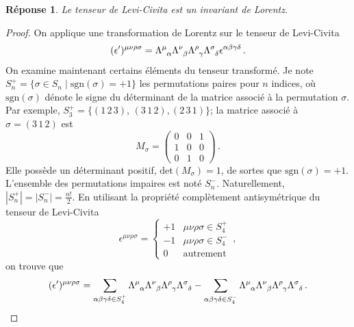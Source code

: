 \documentclass{article}
\numberwithin{equation}{section}
\theoremstyle{solution}
\newtheorem{solution}{Réponse}[section]
\begin{document}
\begin{solution}
Le tenseur de Levi-Civita est un invariant de Lorentz.
\end{solution}
\begin{proof}
On applique une transformation de Lorentz sur le tenseur de Levi-Civita
\begin{align*}
        (\epsilon')^{\mu\nu\rho\sigma} = \Lambda\indices{^{\mu}_{\alpha}} \Lambda\indices{^{\nu}_{\beta}} \Lambda\indices{^{\rho}_{\gamma}} \Lambda\indices{^{\sigma}_{\delta}} \epsilon^{\alpha\beta\gamma\delta }\, .
\end{align*} 
On examine maintenant certains éléments du tenseur transformé. Je note $S_n^{+} = \{\sigma \in S_n \mid \mathrm{sgn}(\sigma) = +1\}$ les permutations paires 
pour $n$ indices, où $\mathrm{sgn}(\sigma)$ dénote le signe du déterminant de la matrice associé à la permutation $\sigma$.
Par exemple, $S_3^{+} = \{(1\, 2\, 3),\, (3\, 1\, 2), (2\, 3\, 1)\}$; la matrice associé 
à $\sigma = (3\, 1\, 2)$ est
\begin{equation*}
M_{\sigma} = \begin{pmatrix}
        0 & 0 & 1 \\
        1 & 0 & 0 \\
        0 & 1 & 0
\end{pmatrix}\, .
\end{equation*} 
Elle possède un déterminant positif, $\mathrm{det}(M_\sigma) = 1$, de sortes que $\mathrm{sgn}(\sigma) = +1$. 
L'ensemble des permutations impaires est noté $S_n^{-}$. Naturellement, $|S_n^{+}| = |S_n^{-}| = \frac{n!}{2}$. 
En utilisant la propriété complètement antisymétrique du tenseur de Levi-Civita
\begin{equation}
        \epsilon^{\mu\nu\rho\sigma} = \begin{cases}
                +1 & \mu\nu\rho\sigma \in S_4^{+} \\
                -1 & \mu\nu\rho\sigma \in S_4^{-} \\
                0 & \mathrm{autrement}
        \end{cases}\, ,
\end{equation} 
on trouve que
\begin{equation}
        (\epsilon')^{\mu\nu\rho\sigma} = 
        \sum_{\alpha\beta\gamma\delta \in S_4^{+}} 
 \Lambda\indices{^{\mu}_{\alpha}} \Lambda\indices{^{\nu}_{\beta}} \Lambda\indices{^{\rho}_{\gamma}} \Lambda\indices{^{\sigma}_{\delta}} 
-
        \sum_{\alpha\beta\gamma\delta \in S_4^{-}} 
 \Lambda\indices{^{\mu}_{\alpha}} \Lambda\indices{^{\nu}_{\beta}} \Lambda\indices{^{\rho}_{\gamma}} \Lambda\indices{^{\sigma}_{\delta}} \, .
\end{equation} 


\end{proof}
\end{document}
